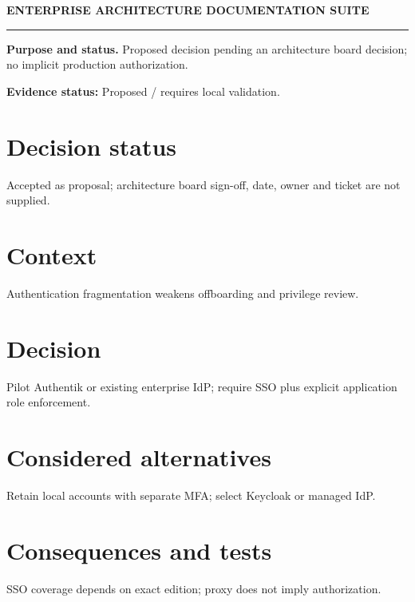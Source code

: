 \documentclass[10pt,letterpaper]{article}
\begin{document}
\begin{center}
{\large\bfseries\color{teal} ENTERPRISE ARCHITECTURE DOCUMENTATION SUITE}\par
{}\par
{}\par
\end{center}
\vspace{8pt}\hrule\vspace{12pt}
\textbf{Purpose and status.} Proposed decision pending an architecture board decision; no implicit production authorization.\par
\textbf{Evidence status:} Proposed / requires local validation.\par
\section{Decision status}
Accepted as proposal; architecture board sign-off, date, owner and ticket are not supplied.\par
\section{Context}
Authentication fragmentation weakens offboarding and privilege review.\par
\section{Decision}
Pilot Authentik or existing enterprise IdP; require SSO plus explicit application role enforcement.\par
\section{Considered alternatives}
Retain local accounts with separate MFA; select Keycloak or managed IdP.\par
\section{Consequences and tests}
SSO coverage depends on exact edition; proxy does not imply authorization.\par
\end{document}
